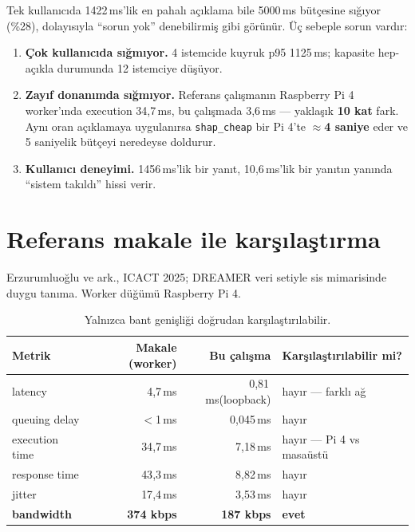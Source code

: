 \documentclass[11pt,a4paper]{report}
\newcommand{\ms}{\,ms}
\newcommand{\kod}[1]{\texttt{\small #1}}
\begin{document}
Tek kullanıcıda 1422\ms'lik en pahalı açıklama bile 5000\ms{} bütçesine sığıyor
(\%28), dolayısıyla ``sorun yok'' denebilirmiş gibi görünür. Üç sebeple sorun
vardır:

\begin{enumerate}[leftmargin=1.5em]
\item \textbf{Çok kullanıcıda sığmıyor.} 4 istemcide kuyruk p95 1125\ms;
kapasite hep-açıkla durumunda 12 istemciye düşüyor.
\item \textbf{Zayıf donanımda sığmıyor.} Referans çalışmanın Raspberry Pi 4
worker'ında execution 34{,}7\ms, bu çalışmada 3{,}6\ms{} --- yaklaşık
\textbf{10 kat} fark. Aynı oran açıklamaya uygulanırsa \kod{shap\_cheap} bir
Pi 4'te \textbf{$\approx$4 saniye} eder ve 5 saniyelik bütçeyi neredeyse
doldurur.
\item \textbf{Kullanıcı deneyimi.} 1456\ms'lik bir yanıt, 10{,}6\ms'lik bir
yanıtın yanında ``sistem takıldı'' hissi verir.
\end{enumerate}

\section{Referans makale ile karşılaştırma}

Erzurumluoğlu ve ark., ICACT 2025; DREAMER veri setiyle sis mimarisinde duygu
tanıma. Worker düğümü Raspberry Pi 4.

\begin{table}[H]
\centering\small
\begin{tabular}{@{}lrrl@{}}
\toprule
\textbf{Metrik} & \textbf{Makale (worker)} & \textbf{Bu çalışma} & \textbf{Karşılaştırılabilir mi?} \\
\midrule
latency        & 4{,}7\ms  & 0{,}81\ms (loopback) & hayır --- farklı ağ \\
queuing delay  & $<$1\ms   & 0{,}045\ms & hayır \\
execution time & 34{,}7\ms & 7{,}18\ms  & hayır --- Pi 4 vs masaüstü \\
response time  & 43{,}3\ms & 8{,}82\ms  & hayır \\
jitter         & 17{,}4\ms & 3{,}53\ms  & hayır \\
\textbf{bandwidth} & \textbf{374 kbps} & \textbf{187 kbps} & \textbf{evet} \\
\bottomrule
\end{tabular}
\caption{Yalnızca bant genişliği doğrudan karşılaştırılabilir.}
\end{table}
\end{document}
